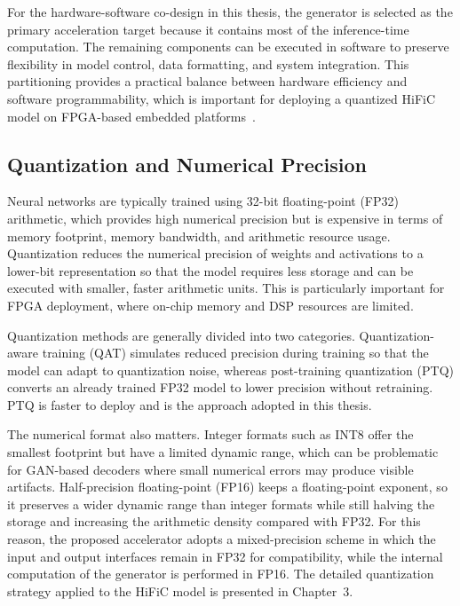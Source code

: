 For the hardware-software co-design in this thesis, the generator is selected as the primary acceleration target because it contains most of the inference-time computation. The remaining components can be executed in software to preserve flexibility in model control, data formatting, and system integration. This partitioning provides a practical balance between hardware efficiency and software programmability, which is important for deploying a quantized HiFiC model on FPGA-based embedded platforms~\cite{mentzer2020high,sze2017efficient}.

\subsection{Quantization and Numerical Precision}

Neural networks are typically trained using 32-bit floating-point (FP32) arithmetic, which provides high numerical precision but is expensive in terms of memory footprint, memory bandwidth, and arithmetic resource usage. Quantization reduces the numerical precision of weights and activations to a lower-bit representation so that the model requires less storage and can be executed with smaller, faster arithmetic units. This is particularly important for FPGA deployment, where on-chip memory and DSP resources are limited.

Quantization methods are generally divided into two categories. Quantization-aware training (QAT) simulates reduced precision during training so that the model can adapt to quantization noise, whereas post-training quantization (PTQ) converts an already trained FP32 model to lower precision without retraining. PTQ is faster to deploy and is the approach adopted in this thesis.

The numerical format also matters. Integer formats such as INT8 offer the smallest footprint but have a limited dynamic range, which can be problematic for GAN-based decoders where small numerical errors may produce visible artifacts. Half-precision floating-point (FP16) keeps a floating-point exponent, so it preserves a wider dynamic range than integer formats while still halving the storage and increasing the arithmetic density compared with FP32. For this reason, the proposed accelerator adopts a mixed-precision scheme in which the input and output interfaces remain in FP32 for compatibility, while the internal computation of the generator is performed in FP16. The detailed quantization strategy applied to the HiFiC model is presented in Chapter~3.



